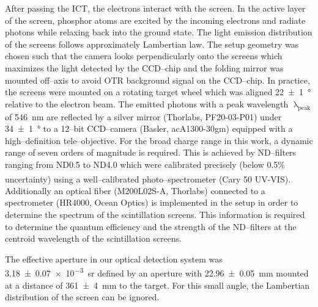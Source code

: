 \documentclass[%
preprint,
amsmath,
amssymb,
aip,
rsi, 
numerical,
floatfix,
]{revtex4-1}
\newcommand{\myCite}[1]{\textcolor{blue}{\cite{#1}}}
\begin{document}
After passing the ICT, the electrons interact with the screen. 
In the active layer of the screen, phosphor atoms are excited by the incoming electrons and radiate photons while relaxing back into the ground state.
The light emission distribution of the screens follows approximately Lambertian law\myCite{Giakoumakis1985}.
The setup geometry was chosen such that the camera looks perpendicularly onto the screens which maximizes the light detected by the CCD--chip and the folding mirror was mounted off--axis to avoid OTR background signal on the CCD--chip.
In practice, the screens were mounted on a rotating target wheel which was aligned \SI[separate-uncertainty = true]{22(1)}{\degree} relative to the electron beam. 
The emitted photons with a peak wavelength $\uplambda_{\text{peak}}$ of \SI{546}{\nano\metre} are reflected by a silver mirror (Thorlabs, PF20-03-P01) under \SI[separate-uncertainty = true]{34(1)}{\degree} to a 12--bit CCD--camera (Basler, acA1300-30gm) equipped with a high--definition tele--objective. 
For the broad charge range in this work, a dynamic range of seven orders of magnitude is required.
This is achieved by ND--filters ranging from ND0.5 to ND4.0 which were calibrated precisely (below 0.5$\%$ uncertainty) using a well--calibrated photo--spectrometer (Cary\textsuperscript{\textregistered} 50 UV-VIS).
Additionally an optical fiber (M200L02S-A, Thorlabs) connected to a spectrometer (HR4000, Ocean Optics) is implemented in the setup in order to determine the spectrum of the scintillation screens.
This information is required to determine the quantum efficiency and the strength of the ND--filters at the centroid wavelength of the scintillation screens. 

The effective aperture in our optical detection system was \SI[separate-uncertainty = true]{3.18(7)e-3}{\steradian} defined by an aperture with \SI[separate-uncertainty = true]{22.96(5)}{\milli\metre} mounted at a distance of \SI[separate-uncertainty = true]{361(4)}{\milli\metre} to the target.
For this small angle, the Lambertian distribution of the screen can be ignored.
\end{document}
